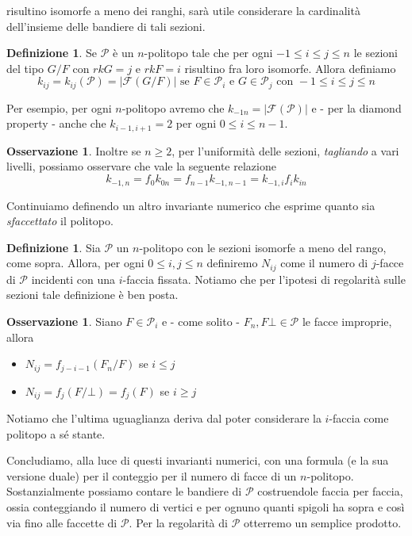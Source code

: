 \documentclass[a4paper,12pt]{report}
\newcommand{\p}{\mathcal{P}}
\theoremstyle{plain}
\theoremstyle{definition}
\newtheorem{defin}[teo]{Definizione}
\newtheorem{oss}[teo]{Osservazione}
\begin{document}
risultino isomorfe a meno dei ranghi, sar\`a utile considerare la cardinalit\`a dell'insieme delle bandiere di tali sezioni.
\begin{defin}
Se $\p$ \`e un $n$-politopo tale che per ogni $-1\leq i\leq j\leq n$ le sezioni del tipo $G/F$ con $rkG=j$ e $rkF=i$ risultino fra loro isomorfe.
Allora definiamo
\begin{equation}
k_{ij}=k_{ij}(\p)=\left|\mathcal{F}(G/F)\right|\text{ se }F\in\p_i\text{ e }G\in\p_j\text{ con }-1\leq i\leq j\leq n
\end{equation}
\end{defin}
Per esempio, per ogni $n$-politopo avremo che $k_{-1n}=\left|\mathcal{F}(\p)\right|$ e - per la diamond property - anche che
$k_{i-1,i+1}=2$ per ogni $0\leq i\leq n-1$.
\begin{oss}
Inoltre se $n\geq 2$, per l'uniformit\`a delle sezioni, \emph{tagliando} a vari livelli, possiamo osservare che vale la seguente relazione
\begin{equation}
\label{kijf}
k_{-1,n}=f_0k_{0n}=f_{n-1}k_{-1,n-1}=k_{-1,i}f_ik_{in}
\end{equation}
\end{oss}
Continuiamo definendo un altro invariante numerico che esprime quanto sia \emph{sfaccettato} il politopo.
\begin{defin}
Sia $\p$ un $n$-politopo con le sezioni isomorfe a meno del rango, come sopra. Allora, per ogni $0\leq i,j\leq n$ definiremo $N_{ij}$ come
il numero di $j$-facce di $\p$ incidenti con una $i$-faccia fissata.
Notiamo che per l'ipotesi di regolarit\`a sulle sezioni tale definizione \`e ben posta.
\end{defin}
\begin{oss}
Siano $F\in\p_i$ e - come solito - $F_n,F\bot\in\p$ le facce improprie, allora
\begin{itemize}
\item $N_{ij}=f_{j-i-1}(F_n/F)$ se $i\leq j$
\item $N_{ij}=f_j(F/\bot)=f_j(F)$ se $i\geq j$
\end{itemize}
Notiamo che l'ultima uguaglianza deriva dal poter considerare la $i$-faccia come politopo a s\'e stante.
\end{oss}
Concludiamo, alla luce di questi invarianti numerici, con una formula (e la sua versione duale) per il conteggio per il numero di facce di un $n$-politopo.
Sostanzialmente possiamo contare le bandiere di $\p$ costruendole faccia per faccia, ossia conteggiando il numero di vertici e per ognuno quanti spigoli
ha sopra e cos\`i via fino alle faccette di $\p$. Per la regolarit\`a di $\p$ otterremo un semplice prodotto.
\end{document}
